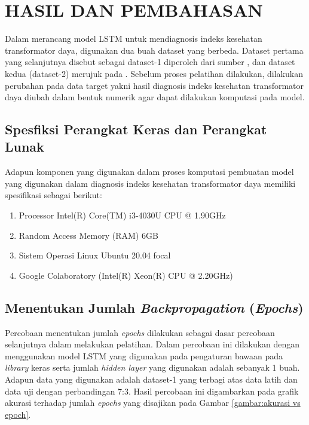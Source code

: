 \chapter{HASIL DAN PEMBAHASAN}
\label{BAB4:hasil}

Dalam merancang model LSTM untuk mendiagnosis indeks kesehatan transformator daya, digunakan dua buah dataset yang berbeda. Dataset pertama yang selanjutnya disebut sebagai dataset-1 diperoleh dari sumber \cite{shah2016predict}, dan dataset kedua (dataset-2) merujuk pada \cite{abu2012calculation}. Sebelum proses pelatihan dilakukan, dilakukan perubahan pada data target yakni hasil diagnosis indeks kesehatan transformator daya diubah dalam bentuk numerik agar dapat dilakukan komputasi pada model. 
\section{Spesfiksi Perangkat Keras dan Perangkat Lunak}
Adapun komponen yang digunakan dalam proses komputasi pembuatan model yang digunakan dalam diagnosis indeks kesehatan transformator daya memiliki spesifikasi sebagai berikut:
\begin{enumerate}
	\setlength{\itemsep}{0pt}%
	\item Processor Intel(R) Core(TM) i3-4030U CPU @ 1.90GHz
	\item Random Access Memory (RAM) 6GB
	\item Sistem Operasi Linux Ubuntu 20.04 focal
	\item Google Colaboratory (Intel(R) Xeon(R) CPU @ 2.20GHz)
\end{enumerate}

\section{Menentukan Jumlah \textit{Backpropagation} (\textit{Epochs})}
Percobaan menentukan jumlah \textit{epochs} dilakukan sebagai dasar percobaan selanjutnya dalam melakukan pelatihan. Dalam percobaan ini dilakukan dengan menggunakan model LSTM yang digunakan pada pengaturan bawaan pada \textit{library} keras serta jumlah \textit{hidden layer} yang digunakan adalah sebanyak 1 buah. Adapun data yang digunakan adalah dataset-1 yang terbagi atas data latih dan data uji dengan perbandingan 7:3. Hasil percobaan ini digambarkan pada grafik akurasi terhadap jumlah \textit{epochs} yang disajikan pada Gambar \ref{gambar:akurasi vs epoch}. 

\begin{minipage}{\textwidth}
	\centering
	\label{gambar:akurasi vs epoch}
\end{minipage}

